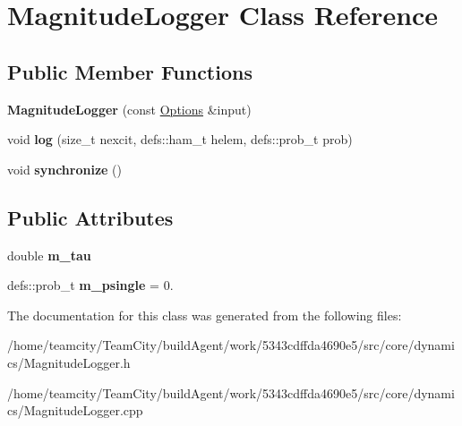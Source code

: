 \hypertarget{classMagnitudeLogger}{}\section{Magnitude\+Logger Class Reference}
\label{classMagnitudeLogger}
\subsection*{Public Member Functions}
\begin{DoxyCompactItemize}
\item 
{\bfseries Magnitude\+Logger} (const \hyperlink{structOptions}{Options} \&input)\hypertarget{classMagnitudeLogger_a10154b8f27b685ea29044208390cd3cb}{}\label{classMagnitudeLogger_a10154b8f27b685ea29044208390cd3cb}

\item 
void {\bfseries log} (size\+\_\+t nexcit, defs\+::ham\+\_\+t helem, defs\+::prob\+\_\+t prob)\hypertarget{classMagnitudeLogger_a50dc0492ea1893bf842f56cf84622629}{}\label{classMagnitudeLogger_a50dc0492ea1893bf842f56cf84622629}

\item 
void {\bfseries synchronize} ()\hypertarget{classMagnitudeLogger_ad63c86c12d8942ada954d5b9ae19b6f7}{}\label{classMagnitudeLogger_ad63c86c12d8942ada954d5b9ae19b6f7}

\end{DoxyCompactItemize}
\subsection*{Public Attributes}
\begin{DoxyCompactItemize}
\item 
double {\bfseries m\+\_\+tau}\hypertarget{classMagnitudeLogger_aa890fe7cb4fb9148d2c7e916fb32d007}{}\label{classMagnitudeLogger_aa890fe7cb4fb9148d2c7e916fb32d007}

\item 
defs\+::prob\+\_\+t {\bfseries m\+\_\+psingle} = 0.\hypertarget{classMagnitudeLogger_a12b64f54221d8b89458f52b51820ee40}{}\label{classMagnitudeLogger_a12b64f54221d8b89458f52b51820ee40}

\end{DoxyCompactItemize}


The documentation for this class was generated from the following files\+:\begin{DoxyCompactItemize}
\item 
/home/teamcity/\+Team\+City/build\+Agent/work/5343cdffda4690e5/src/core/dynamics/Magnitude\+Logger.\+h\item 
/home/teamcity/\+Team\+City/build\+Agent/work/5343cdffda4690e5/src/core/dynamics/Magnitude\+Logger.\+cpp\end{DoxyCompactItemize}
